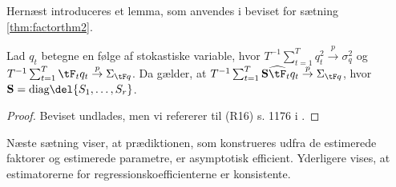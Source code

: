 %
Hernæst introduceres et lemma, som anvendes i beviset for sætning \ref{thm:factorthm2}.
%
\begin{lem} \label{lem:factorlem1}
Lad \(q_t\) betegne en følge af stokastiske variable, hvor \(T^{-1} \sum_{t=1}^T q_t^2 \overset{p}{\rightarrow} \sigma_q^2\) og \(T^{-1} \sum_{t=1}^T \tF_t q_t \overset{p}{\rightarrow} \Sigma_{\tF q}\).
Da gælder, at \(T^{-1} \sum_{t=1}^T \mathbf{S} \widehat{\tF}_t q_t \overset{p}{\rightarrow} \Sigma_{\tF q}\), hvor \(\mathbf{S} = \text{diag} \del{S_1, \ldots, S_r}\).
\end{lem}
\begin{proof}
Beviset undlades, men vi refererer til (R16) s. 1176 i \citep{stock_watson_2002a}.
\end{proof}
%
%
Næste sætning viser, at prædiktionen, som konstrueres udfra de estimerede faktorer og estimerede parametre, er asymptotisk efficient.
Yderligere vises, at estimatorerne for regressionskoefficienterne er konsistente.

